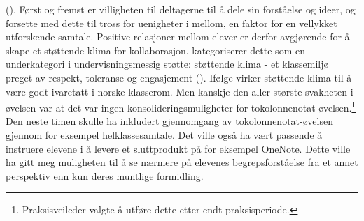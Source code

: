 \documentclass[main.tex]{subfiles}
\begin{document}
(). Først og fremst er villigheten til deltagerne til å dele sin forståelse 
og ideer, og forsette med dette til tross for uenigheter i mellom, en faktor for en vellykket 
utforskende samtale. Positive relasjoner mellom elever er derfor avgjørende for å skape et støttende 
klima for kollaborasjon.  kategoriserer dette som en underkategori i 
undervisningsmessig støtte: støttende klima - et klassemiljø preget av respekt, toleranse og 
engasjement (). Ifølge  virker støttende klima til å være 
godt ivaretatt i norske klasserom. Men kanskje den aller største svakheten i øvelsen var at det 
var ingen konsolideringsmuligheter for tokolonnenotat øvelsen.\footnote[5]{Praksisveileder valgte 
å utføre dette etter endt praksisperiode.} Den neste timen skulle ha inkludert gjennomgang av 
tokolonnenotat-øvelsen gjennom for eksempel helklassesamtale. Det ville også ha vært passende
å instruere elevene i å levere et sluttprodukt på for eksempel OneNote. Dette ville ha gitt meg
muligheten til å se nærmere på elevenes begrepsforståelse fra et annet perspektiv enn kun deres 
muntlige formidling.  
\end{document}
